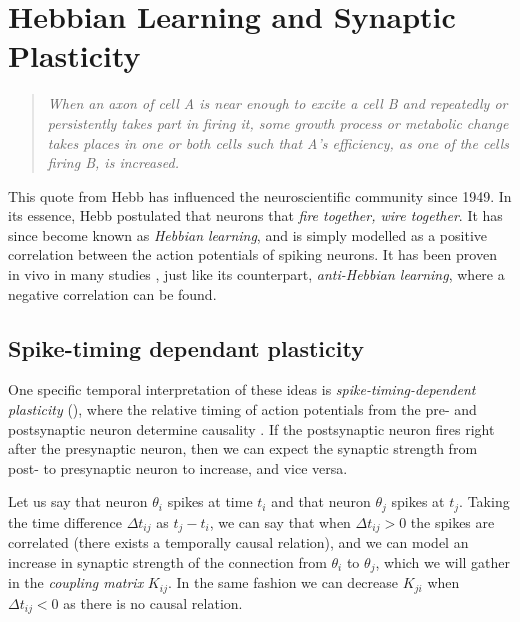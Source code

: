 \newpage
\section{Hebbian Learning and Synaptic Plasticity}
\vspace{1mm}
\begin{quote}
\textsl{When an axon of cell A is near enough to excite a cell B and repeatedly or persistently takes part in firing it, some growth process or metabolic change takes places in one or both cells such that A's efficiency, as one of the cells firing B, is increased.}\cite{Hebb1949}
\end{quote}

This quote from Hebb has influenced the neuroscientific community since 1949. In its essence, Hebb postulated that neurons that \textsl{fire together, wire together}. It has since become known as \textsl{Hebbian learning}, and is simply modelled as a positive correlation between the action potentials of spiking neurons. It has been proven in vivo in many studies \cite{ChrolCannon2014}, just like its counterpart, \textsl{anti-Hebbian learning}, where a negative correlation can be found.


\subsection{Spike-timing dependant plasticity}
One specific temporal interpretation of these ideas is \textsl{spike-timing-dependent plasticity} (\STDP), where the relative timing of action potentials from the pre- and postsynaptic neuron determine causality \cite{Kempter1999, Gerstner2002}. If the postsynaptic neuron fires right after the presynaptic neuron, then we can expect the synaptic strength from post- to presynaptic neuron to increase, and vice versa. 

Let us say that neuron $\theta_i$ spikes at time $t_i$ and that neuron $\theta_j$ spikes at $t_j$. Taking the time difference $\Delta t_{ij}$ as $t_j - t_i$, we can say that when $\Delta t_{ij} > 0$ the spikes are correlated (there exists a temporally causal relation), and we can model an increase in synaptic strength of the connection from $\theta_i$ to $\theta_j$, which we will gather in the \textsl{coupling matrix} $K_{ij}$. In the same fashion we can decrease $K_{ji}$ when $\Delta t_{ij} < 0$ as there is no causal relation. \\


